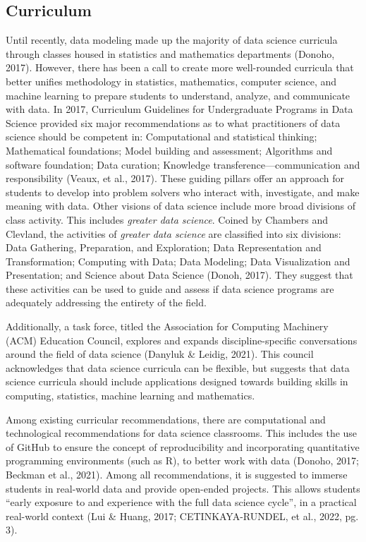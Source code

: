 \documentclass[
  12pt]{article}
\begin{document}
\hypertarget{sec-curr}{%
\subsection{Curriculum}\label{sec-curr}}

Until recently, data modeling made up the majority of data science
curricula through classes housed in statistics and mathematics
departments (Donoho, 2017). However, there has been a call to create
more well-rounded curricula that better unifies methodology in
statistics, mathematics, computer science, and machine learning to
prepare students to understand, analyze, and communicate with data. In
2017, Curriculum Guidelines for Undergraduate Programs in Data Science
provided six major recommendations as to what practitioners of data
science should be competent in: Computational and statistical thinking;
Mathematical foundations; Model building and assessment; Algorithms and
software foundation; Data curation; Knowledge
transference---communication and responsibility (Veaux, et al., 2017).
These guiding pillars offer an approach for students to develop into
problem solvers who interact with, investigate, and make meaning with
data. Other visions of data science include more broad divisions of
class activity. This includes \emph{greater data science}. Coined by
Chambers and Clevland, the activities of \emph{greater data science} are
classified into six divisions: Data Gathering, Preparation, and
Exploration; Data Representation and Transformation; Computing with
Data; Data Modeling; Data Visualization and Presentation; and Science
about Data Science (Donoh, 2017). They suggest that these activities can
be used to guide and assess if data science programs are adequately
addressing the entirety of the field.

Additionally, a task force, titled the Association for Computing
Machinery (ACM) Education Council, explores and expands
discipline-specific conversations around the field of data science
(Danyluk \& Leidig, 2021). This council acknowledges that data science
curricula can be flexible, but suggests that data science curricula
should include applications designed towards building skills in
computing, statistics, machine learning and mathematics.

Among existing curricular recommendations, there are computational and
technological recommendations for data science classrooms. This includes
the use of GitHub to ensure the concept of reproducibility and
incorporating quantitative programming environments (such as R), to
better work with data (Donoho, 2017; Beckman et al., 2021). Among all
recommendations, it is suggested to immerse students in real-world data
and provide open-ended projects. This allows students ``early exposure
to and experience with the full data science cycle'', in a practical
real-world context (Lui \& Huang, 2017; CETINKAYA-RUNDEL, et al., 2022,
pg. 3).
\end{document}
